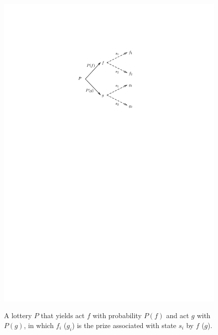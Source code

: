 \documentclass[12pt, notitlepage]{article}
\begin{document}
\begin{figure}[h!]
  \centering   \label{fig_eaep_intro_to_delete}
    \includegraphics{img/object.pdf}
    \caption{A lottery $P$ that yields act $f$ with
probability $P(f)$ and act $g$ with $P(g)$, in which $f_{i}$ ($g_{i}$) is
the prize associated with state $s_{i}$ by $f$ ($g$).}
\end{figure}
\end{document}
